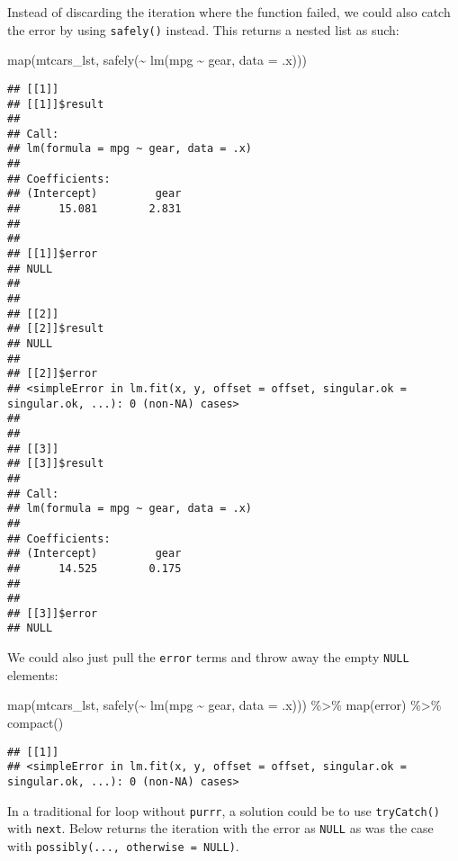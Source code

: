 \documentclass[
]{book}
\newenvironment{Shaded}{\begin{snugshade}}{\end{snugshade}}
\newcommand{\AttributeTok}[1]{\textcolor[rgb]{0.77,0.63,0.00}{#1}}
\newcommand{\FunctionTok}[1]{\textcolor[rgb]{0.00,0.00,0.00}{#1}}
\newcommand{\NormalTok}[1]{#1}
\newcommand{\SpecialCharTok}[1]{\textcolor[rgb]{0.00,0.00,0.00}{#1}}
\newcommand{\StringTok}[1]{\textcolor[rgb]{0.31,0.60,0.02}{#1}}
\begin{document}
Instead of discarding the iteration where the function failed, we could also catch the error by using \texttt{safely()} instead. This returns a nested list as such:

\begin{Shaded}
\begin{Highlighting}[]
\FunctionTok{map}\NormalTok{(mtcars\_lst, }\FunctionTok{safely}\NormalTok{(}\SpecialCharTok{\textasciitilde{}} \FunctionTok{lm}\NormalTok{(mpg }\SpecialCharTok{\textasciitilde{}}\NormalTok{ gear, }\AttributeTok{data =}\NormalTok{ .x)))}
\end{Highlighting}
\end{Shaded}

\begin{verbatim}
## [[1]]
## [[1]]$result
## 
## Call:
## lm(formula = mpg ~ gear, data = .x)
## 
## Coefficients:
## (Intercept)         gear  
##      15.081        2.831  
## 
## 
## [[1]]$error
## NULL
## 
## 
## [[2]]
## [[2]]$result
## NULL
## 
## [[2]]$error
## <simpleError in lm.fit(x, y, offset = offset, singular.ok = singular.ok, ...): 0 (non-NA) cases>
## 
## 
## [[3]]
## [[3]]$result
## 
## Call:
## lm(formula = mpg ~ gear, data = .x)
## 
## Coefficients:
## (Intercept)         gear  
##      14.525        0.175  
## 
## 
## [[3]]$error
## NULL
\end{verbatim}

We could also just pull the \texttt{error} terms and throw away the empty \texttt{NULL} elements:

\begin{Shaded}
\begin{Highlighting}[]
\FunctionTok{map}\NormalTok{(mtcars\_lst, }\FunctionTok{safely}\NormalTok{(}\SpecialCharTok{\textasciitilde{}} \FunctionTok{lm}\NormalTok{(mpg }\SpecialCharTok{\textasciitilde{}}\NormalTok{ gear, }\AttributeTok{data =}\NormalTok{ .x))) }\SpecialCharTok{\%\textgreater{}\%} \FunctionTok{map}\NormalTok{(}\StringTok{\textquotesingle{}error\textquotesingle{}}\NormalTok{) }\SpecialCharTok{\%\textgreater{}\%}
  \FunctionTok{compact}\NormalTok{()}
\end{Highlighting}
\end{Shaded}

\begin{verbatim}
## [[1]]
## <simpleError in lm.fit(x, y, offset = offset, singular.ok = singular.ok, ...): 0 (non-NA) cases>
\end{verbatim}

In a traditional for loop without \texttt{purrr}, a solution could be to use \texttt{tryCatch()} with \texttt{next}. Below returns the iteration with the error as \texttt{NULL} as was the case with \texttt{possibly(...,\ otherwise\ =\ NULL)}.
\end{document}
